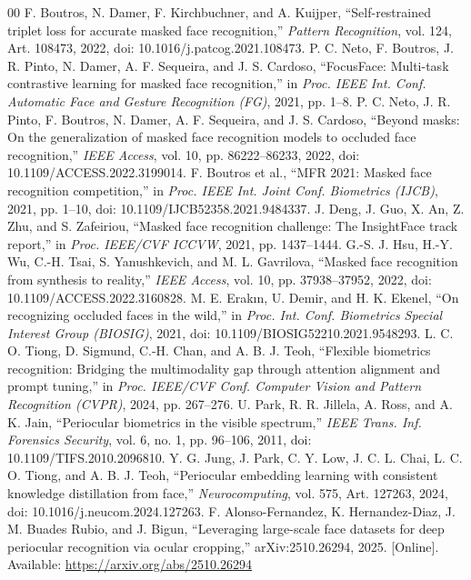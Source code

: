 \documentclass[10pt,journal,compsoc]{IEEEtran}
\begin{document}
\begin{thebibliography}{00}
 F. Boutros, N. Damer, F. Kirchbuchner, and A. Kuijper, ``Self-restrained triplet loss for accurate masked face recognition,'' \textit{Pattern Recognition}, vol. 124, Art. 108473, 2022, doi: 10.1016/j.patcog.2021.108473.
 P. C. Neto, F. Boutros, J. R. Pinto, N. Damer, A. F. Sequeira, and J. S. Cardoso, ``FocusFace: Multi-task contrastive learning for masked face recognition,'' in \textit{Proc. IEEE Int. Conf. Automatic Face and Gesture Recognition (FG)}, 2021, pp. 1--8.
 P. C. Neto, J. R. Pinto, F. Boutros, N. Damer, A. F. Sequeira, and J. S. Cardoso, ``Beyond masks: On the generalization of masked face recognition models to occluded face recognition,'' \textit{IEEE Access}, vol. 10, pp. 86222--86233, 2022, doi: 10.1109/ACCESS.2022.3199014.
 F. Boutros et al., ``MFR 2021: Masked face recognition competition,'' in \textit{Proc. IEEE Int. Joint Conf. Biometrics (IJCB)}, 2021, pp. 1--10, doi: 10.1109/IJCB52358.2021.9484337.
 J. Deng, J. Guo, X. An, Z. Zhu, and S. Zafeiriou, ``Masked face recognition challenge: The InsightFace track report,'' in \textit{Proc. IEEE/CVF ICCVW}, 2021, pp. 1437--1444.
 G.-S. J. Hsu, H.-Y. Wu, C.-H. Tsai, S. Yanushkevich, and M. L. Gavrilova, ``Masked face recognition from synthesis to reality,'' \textit{IEEE Access}, vol. 10, pp. 37938--37952, 2022, doi: 10.1109/ACCESS.2022.3160828.
 M. E. Erakın, U. Demir, and H. K. Ekenel, ``On recognizing occluded faces in the wild,'' in \textit{Proc. Int. Conf. Biometrics Special Interest Group (BIOSIG)}, 2021, doi: 10.1109/BIOSIG52210.2021.9548293.
 L. C. O. Tiong, D. Sigmund, C.-H. Chan, and A. B. J. Teoh, ``Flexible biometrics recognition: Bridging the multimodality gap through attention alignment and prompt tuning,'' in \textit{Proc. IEEE/CVF Conf. Computer Vision and Pattern Recognition (CVPR)}, 2024, pp. 267--276.
 U. Park, R. R. Jillela, A. Ross, and A. K. Jain, ``Periocular biometrics in the visible spectrum,'' \textit{IEEE Trans. Inf. Forensics Security}, vol. 6, no. 1, pp. 96--106, 2011, doi: 10.1109/TIFS.2010.2096810.
 Y. G. Jung, J. Park, C. Y. Low, J. C. L. Chai, L. C. O. Tiong, and A. B. J. Teoh, ``Periocular embedding learning with consistent knowledge distillation from face,'' \textit{Neurocomputing}, vol. 575, Art. 127263, 2024, doi: 10.1016/j.neucom.2024.127263.
 F. Alonso-Fernandez, K. Hernandez-Diaz, J. M. Buades Rubio, and J. Bigun, ``Leveraging large-scale face datasets for deep periocular recognition via ocular cropping,'' arXiv:2510.26294, 2025. [Online]. Available: \url{https://arxiv.org/abs/2510.26294}

\end{thebibliography}
\end{document}
